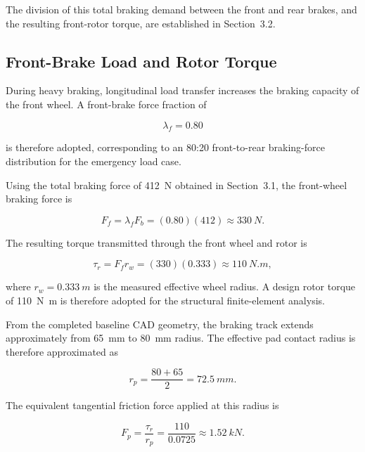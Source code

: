 \documentclass[11pt,a4paper]{article}
\begin{document}
The division of this total braking demand between the front and rear brakes,
and the resulting front-rotor torque, are established in Section~3.2.


\subsection{Front-Brake Load and Rotor Torque}

During heavy braking, longitudinal load transfer increases the braking capacity
of the front wheel. A front-brake force fraction of

\begin{equation}
    \lambda_f = 0.80
\end{equation}

is therefore adopted, corresponding to an 80:20 front-to-rear braking-force
distribution for the emergency load case.

Using the total braking force of \SI{412}{N} obtained in Section~3.1, the
front-wheel braking force is

\begin{equation}
    F_f
    =
    \lambda_f F_b
    =
    (0.80)(412)
    \approx
    \SI{330}{N}.
\end{equation}

The resulting torque transmitted through the front wheel and rotor is

\begin{equation}
    \tau_r
    =
    F_f r_w
    =
    (330)(0.333)
    \approx
    \SI{110}{N.m},
\end{equation}

where $r_w=\SI{0.333}{m}$ is the measured effective wheel radius. A design
rotor torque of \SI{110}{N.m} is therefore adopted for the structural
finite-element analysis.

From the completed baseline CAD geometry, the braking track extends
approximately from \SI{65}{mm} to \SI{80}{mm} radius. The effective pad
contact radius is therefore approximated as

\begin{equation}
    r_p
    =
    \frac{80+65}{2}
    =
    \SI{72.5}{mm}.
\end{equation}

The equivalent tangential friction force applied at this radius is

\begin{equation}
    F_p
    =
    \frac{\tau_r}{r_p}
    =
    \frac{110}{0.0725}
    \approx
    \SI{1.52}{kN}.
\end{equation}
\end{document}
